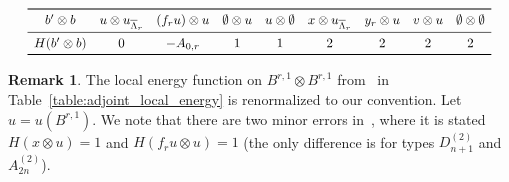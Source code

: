 \documentclass[reqno]{amsart}
\newcommand{\clfw}{\overline{\Lambda}} %
\theoremstyle{plain}
\theoremstyle{definition}
\newtheorem{remark}[thm]{Remark}
\numberwithin{equation}{section}
\begin{document}
\begin{table}
\[
\scalebox{0.93}{$
\begin{array}{ccccccccc}
\toprule
b' \otimes b & u \otimes u_{\clfw_r} & (f_r u) \otimes u & \emptyset \otimes u & u \otimes \emptyset & x \otimes u_{\clfw_r} & y_r \otimes u & v \otimes u & \emptyset \otimes \emptyset
\\ \midrule
H(b' \otimes b) & 0 & -A_{0,r} & 1 & 1 & 2 & 2 & 2 & 2
\\ \bottomrule
\end{array}
$}
\]
\caption{Local energy on $B^{r,1} \otimes B^{r,1}$ for $r \sim 0$, where $u = u(B^{r,1})$, $v = v(B^{r,1})$, $x \in B(\clfw_r) \setminus \{ u, f_r u \}$.}
\label{table:adjoint_local_energy}
\end{table}

\begin{remark}
The local energy function on $B^{r,1} \otimes B^{r,1}$ from~\cite{BFKL06} in Table~\ref{table:adjoint_local_energy} is renormalized to our convention.
Let $u = u(B^{r,1})$.
We note that there are two minor errors in~\cite{BFKL06}, where it is stated $H(x \otimes u) = 1$ and $H(f_r u \otimes u) = 1$ (the only difference is for types $D_{n+1}^{(2)}$ and $A_{2n}^{(2)}$).
\end{remark}
\end{document}
